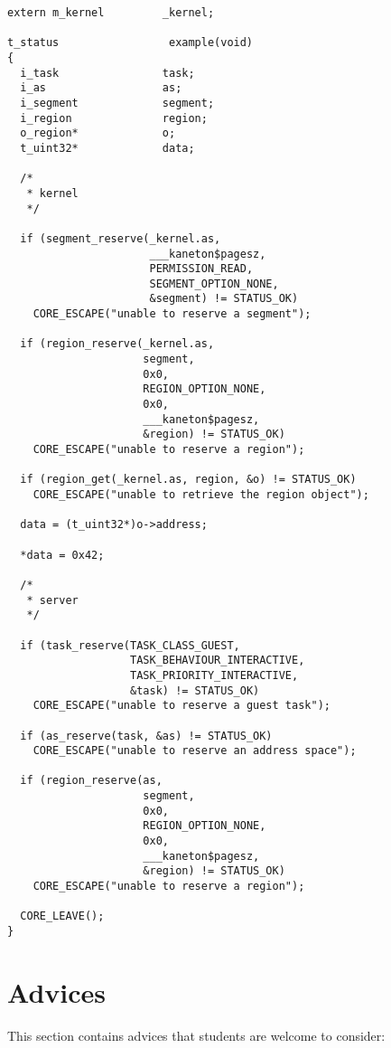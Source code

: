 \begin{verbatim}
extern m_kernel         _kernel;

t_status                 example(void)
{
  i_task                task;
  i_as                  as;
  i_segment             segment;
  i_region              region;
  o_region*             o;
  t_uint32*             data;

  /*
   * kernel
   */

  if (segment_reserve(_kernel.as,
                      ___kaneton$pagesz,
                      PERMISSION_READ,
                      SEGMENT_OPTION_NONE,
                      &segment) != STATUS_OK)
    CORE_ESCAPE("unable to reserve a segment");

  if (region_reserve(_kernel.as,
                     segment,
                     0x0,
                     REGION_OPTION_NONE,
                     0x0,
                     ___kaneton$pagesz,
                     &region) != STATUS_OK)
    CORE_ESCAPE("unable to reserve a region");

  if (region_get(_kernel.as, region, &o) != STATUS_OK)
    CORE_ESCAPE("unable to retrieve the region object");

  data = (t_uint32*)o->address;

  *data = 0x42;

  /*
   * server
   */

  if (task_reserve(TASK_CLASS_GUEST,
                   TASK_BEHAVIOUR_INTERACTIVE,
                   TASK_PRIORITY_INTERACTIVE,
                   &task) != STATUS_OK)
    CORE_ESCAPE("unable to reserve a guest task");

  if (as_reserve(task, &as) != STATUS_OK)
    CORE_ESCAPE("unable to reserve an address space");

  if (region_reserve(as,
                     segment,
                     0x0,
                     REGION_OPTION_NONE,
                     0x0,
                     ___kaneton$pagesz,
                     &region) != STATUS_OK)
    CORE_ESCAPE("unable to reserve a region");

  CORE_LEAVE();
}
\end{verbatim}

%
%

\section{Advices}

This section contains advices that students are welcome to consider:

